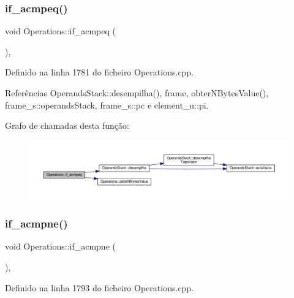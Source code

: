 \subsubsection{\texorpdfstring{if\+\_\+acmpeq()}{if\_acmpeq()}}
{\footnotesize\ttfamily void Operations\+::if\+\_\+acmpeq (\begin{DoxyParamCaption}{ }\end{DoxyParamCaption})\hspace{0.3cm}{\ttfamily [static]}, {\ttfamily [private]}}



Definido na linha 1781 do ficheiro Operations.\+cpp.



Referências Operands\+Stack\+::desempilha(), frame, obter\+N\+Bytes\+Value(), frame\+\_\+s\+::operands\+Stack, frame\+\_\+s\+::pc e element\+\_\+u\+::pi.

Grafo de chamadas desta função\+:
\nopagebreak
\begin{figure}[H]
\begin{center}
\leavevmode
\includegraphics[width=350pt]{classOperations_aa0432645b0d0effb4d4d839ea2dcec1c_cgraph}
\end{center}
\end{figure}
\mbox{\label{classOperations_a7f43bbfba9b2feb66b695d24c43dc430}} 
\subsubsection{\texorpdfstring{if\+\_\+acmpne()}{if\_acmpne()}}
{\footnotesize\ttfamily void Operations\+::if\+\_\+acmpne (\begin{DoxyParamCaption}{ }\end{DoxyParamCaption})\hspace{0.3cm}{\ttfamily [static]}, {\ttfamily [private]}}



Definido na linha 1793 do ficheiro Operations.\+cpp.



